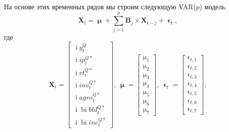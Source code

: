 \documentclass[a4paper, 14pt]{extreport}
\numberwithin{equation}{section}
\renewcommand{\epsilon}{\upvarepsilon}
\renewcommand{\mu}{\upmu}
\renewcommand{\i}{\operatorname{i}}
\newcommand{\bi}{\operatorname{bi}}
\numberwithin{equation}{section}
\begin{document}
	На основе этих временных рядов мы строим следующую VAR($p$) модель
	\begin{equation}
		\label{eq:var-agreg}
		\mathbf X_t = \mathbf \mu + \sum_{j=1}^{p}\mathbf B_j \times \mathbf X_{t-j} + \mathbf \epsilon_t,
	\end{equation}
	где
	\begin{equation*}
	\mathbf X_t = \begin{bmatrix}
		\i y_t^Q \\[1ex] 
		\i ip_{t}^{Q*} \\[1ex] 
		\i rt_{t}^{Q*} \\[1ex] 
		\i inv_{t}^{Q*} \\[1ex] 
		\i agro_{t}^{Q*} \\[1ex]
		\i \bi bld_{t}^{Q*} \\[1ex] 
		\i \bi inc_{t}^{Q*}
	\end{bmatrix},\ 
	\mathbf \mu = 
	\begin{bmatrix}
		\mu_1 \\[1ex] 
		\mu_2 \\[1ex] 
		\mu_3 \\[1ex] 
		\mu_4 \\[1ex] 
		\mu_5 \\[1ex] 
		\mu_6 \\[1ex] 
		\mu_7
	\end{bmatrix},\ 
	\mathbf \epsilon_{t} = \begin{bmatrix}
		\epsilon_{t,1} \\[1ex] 
		\epsilon_{t,2} \\[1ex] 
		\epsilon_{t,3} \\[1ex] 
		\epsilon_{t,4} \\[1ex] 
		\epsilon_{t,5} \\[1ex]
		\epsilon_{t,6} \\[1ex]
		\epsilon_{t,7}
	\end{bmatrix},
	\end{equation*}
\end{document}
